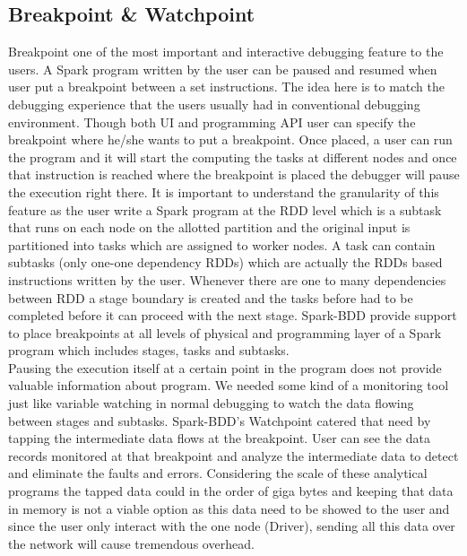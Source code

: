 \documentclass{acm_proc_article-sp}
\begin{document}
\subsection{Breakpoint \& Watchpoint}
Breakpoint one of the most important and interactive debugging feature to the users. A Spark program written by the user can be paused and resumed when user put a breakpoint between a set instructions. The idea here is to match the debugging experience that the users usually had in conventional debugging environment. Though both UI and programming API user can specify the breakpoint where he/she wants to put a breakpoint. Once placed, a user can run the program and it will start the computing the tasks at different nodes and once that instruction is reached where the breakpoint is placed the debugger will pause the execution right there. It is important to understand the granularity of this feature as the user write a Spark program at the RDD level which is a subtask that runs on each node on the allotted partition and the original input is partitioned into tasks which are assigned to worker nodes. A task can contain subtasks (only one-one dependency RDDs) which are actually the RDDs based instructions written by the user. Whenever there are one to many dependencies between RDD a stage boundary is created and the tasks before had to be completed before it can proceed with the next stage. Spark-BDD provide support to place breakpoints at all levels of physical and programming layer of a Spark program which includes stages, tasks and subtasks.\\
Pausing the execution itself at a certain point in the program does not provide valuable information about program. We needed some kind of a monitoring tool just like variable watching in normal debugging to watch the data flowing between stages and subtasks. Spark-BDD's Watchpoint catered that need by tapping the intermediate data flows at the breakpoint. User can see the data records monitored at that breakpoint and analyze the intermediate data to detect and eliminate the faults and errors. Considering the scale of these analytical programs the tapped data could in the order of giga bytes and keeping that data in memory is not a viable option as this data need to be showed to the user and since the user only interact with the one node (Driver), sending all this data over the network will cause tremendous overhead. \\
\end{document}
